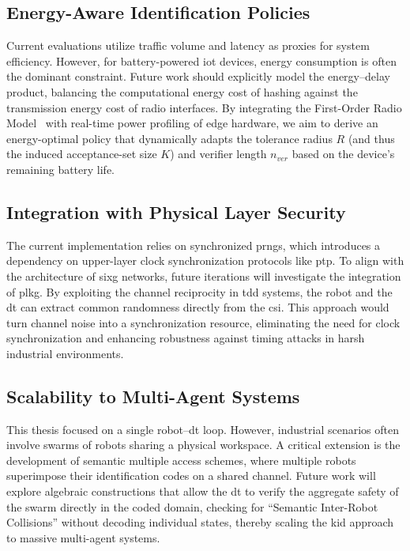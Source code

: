 \subsection{Energy-Aware Identification Policies}
Current evaluations utilize traffic volume and latency as proxies for system efficiency. However, for battery-powered \gls{iot} devices, energy consumption is often the dominant constraint. Future work should explicitly model the energy--delay product, balancing the computational energy cost of hashing against the transmission energy cost of radio interfaces. By integrating the First-Order Radio Model~\cite{heinzelman2000energy} with real-time power profiling of edge hardware, we aim to derive an energy-optimal policy that dynamically adapts the tolerance radius $R$ (and thus the induced acceptance-set size $K$) and verifier length $n_{ver}$ based on the device's remaining battery life.

\subsection[Integration with 6G Physical Layer Security]{Integration with  Physical Layer Security}
The current implementation relies on synchronized \glspl{prng}, which introduces a dependency on upper-layer clock synchronization protocols like \gls{ptp}. To align with the architecture of \gls{sixg} networks, future iterations will investigate the integration of \gls{plkg}. By exploiting the channel reciprocity in \gls{tdd} systems, the robot and the \gls{dt} can extract common randomness directly from the \gls{csi}. This approach would turn channel noise into a synchronization resource, eliminating the need for clock synchronization and enhancing robustness against timing attacks in harsh industrial environments.

\subsection{Scalability to Multi-Agent Systems}
This thesis focused on a single robot--\gls{dt} loop. However, industrial scenarios often involve swarms of robots sharing a physical workspace. A critical extension is the development of semantic multiple access schemes, where multiple robots superimpose their identification codes on a shared channel. Future work will explore algebraic constructions that allow the \gls{dt} to verify the aggregate safety of the swarm directly in the coded domain, checking for \enquote{Semantic Inter-Robot Collisions} without decoding individual states, thereby scaling the \gls{kid} approach to massive multi-agent systems.

